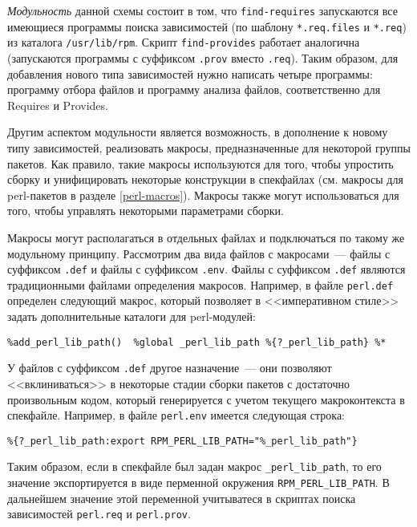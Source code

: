 \documentclass[russian,a4paper,12pt,titlepage]{article}
\begin{document}
\textit{Модульность}\label{modular-approach} данной схемы состоит в том,
что \verb|find-requires| запускаются все имеющиеся программы поиска зависимостей
(по шаблону \verb|*.req.files| и \verb|*.req|) из каталога \verb|/usr/lib/rpm|.  Скрипт \verb|find-provides| работает аналогична
(запускаются программы с суффиксом \verb|.prov| вместо \verb|.req|).  Таким образом, для добавления нового типа зависимостей
нужно написать четыре программы: программу отбора файлов и программу анализа файлов, соответственно для Requires и Provides.

Другим аспектом модульности является возможность, в дополнение к новому типу зависимостей, реализовать макросы,
предназначенные для некоторой группы пакетов.  Как правило, такие макросы используются для того, чтобы упростить
сборку и унифицировать некоторые конструкции в спекфайлах (см. макросы для perl-пакетов в разделе \ref{perl-macros}).
Макросы также могут использоваться для того, чтобы управлять некоторыми параметрами сборки.

Макросы могут располагаться в отдельных файлах и подключаться по такому же модульному принципу.
Рассмотрим два вида файлов с макросами~--- файлы с суффиксом \verb|.def| и файлы с суффиксом \verb|.env|.
Файлы с суффиксом \verb|.def|\label{def-macro-files} являются традиционными файлами определения макросов.  Например,
в файле \verb|perl.def| определен следующий макрос, который позволяет в <<императивном стиле>> задать дополнительные
каталоги для perl-модулей:
\begin{verbatim}
%add_perl_lib_path()  %global _perl_lib_path %{?_perl_lib_path} %*
\end{verbatim}

У файлов с суффиксом \verb|.def| другое назначение~--- они позволяют <<вклиниваться>> в некоторые стадии сборки пакетов
с достаточно произвольным кодом, который генерируется с учетом текущего макроконтекста в спекфайле.
Например, в файле \verb|perl.env|\label{perl-env-intro} имеется следующая строка:
\begin{verbatim}
%{?_perl_lib_path:export RPM_PERL_LIB_PATH="%_perl_lib_path"}
\end{verbatim}
Таким образом, если в спекфайле был задан макрос \verb|_perl_lib_path|, то его значение экспортируется
в виде перменной окружения \verb|RPM_PERL_LIB_PATH|.  В дальнейшем значение этой переменной учитыватеся
в скриптах поиска зависимостей \verb|perl.req| и \verb|perl.prov|.
\end{document}
